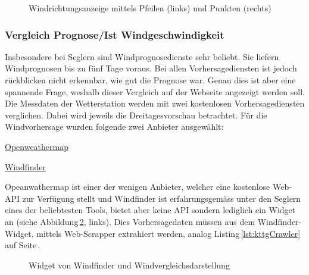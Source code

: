 \begin{figure}[htbp!]
	\centering
	\caption{Windrichtungsanzeige mittels Pfeilen (links) und Punkten (rechts)}
	\label{img:windrichtung}
\end{figure}

\subsubsection{Vergleich Prognose/Ist Windgeschwindigkeit}
Insbesondere bei Seglern sind Windprognosedienste sehr beliebt. Sie liefern Windprognosen bis zu fünf Tage voraus. Bei allen Vorhersagediensten ist jedoch rückblicken nicht erkennbar, wie gut die Prognose war. Genau dies ist aber eine spannende Frage, weshalb dieser Vergleich auf der Webseite angezeigt werden soll. Die Messdaten der Wetterstation werden mit zwei kostenlosen Vorhersagediensten verglichen. Dabei wird jeweils die Dreitagesvorschau betrachtet. Für die Windvorhersage wurden folgende zwei Anbieter ausgewählt:

\begin{itemize*}
\item \href{https://openweathermap.org/city/2661731}{Openweathermap}
\item \href{https://www.windfinder.com/forecast/arbon}{Windfinder}
\end{itemize*}

\noindent
Opeanwathermap ist einer der wenigen Anbieter, welcher eine kostenlose Web-API zur Verfügung stellt und Windfinder ist erfahrungsgemäss unter den Seglern eines der beliebtesten Tools, bietet aber keine API sondern lediglich ein Widget an (siehe Abbildung\,\ref{img:windfinder}, links). Dies Vorhersagedaten müssen aus dem Windfinder-Widget, mittels Web-Scrapper extrahiert werden, analog Listing\,\ref{lst:kttgCrawler} auf Seite\,\pageref{lst:kttgCrawler}.


\begin{figure}[h!]
	\centering
	\caption{Widget von Windfinder und Windvergleichsdarstellung}
	\label{img:windfinder}
\end{figure}

